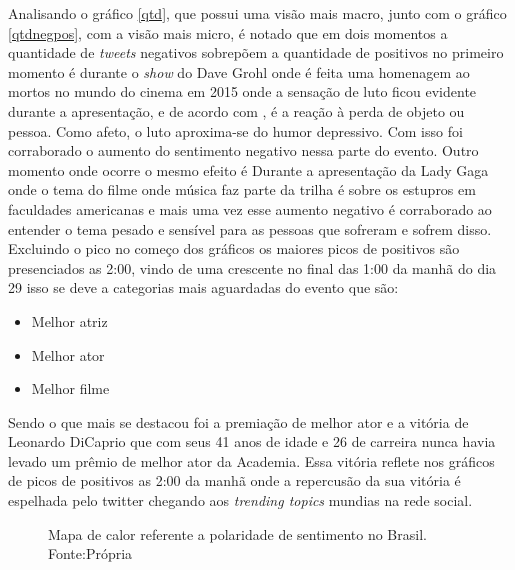 Analisando o gráfico \ref{qtd}, que possui uma visão mais macro, junto com o gráfico \ref{qtdnegpos}, com a visão mais micro, é notado que em dois momentos a quantidade de \textit{tweets} negativos sobrepõem a quantidade de positivos no primeiro momento é durante o \textit{show} do Dave Grohl onde é feita uma homenagem ao mortos no mundo do cinema em 2015 onde a sensação de luto ficou evidente durante a apresentação, e de acordo com \cite{freud1908conferencias}, é a reação à perda de objeto ou pessoa. Como afeto, o luto aproxima-se do humor depressivo. Com isso foi corraborado o aumento do sentimento negativo nessa parte do evento. Outro momento onde ocorre o mesmo efeito é Durante a apresentação da Lady Gaga onde o tema do filme onde música faz parte da trilha é sobre os estupros em faculdades americanas e mais uma vez esse aumento negativo é corraborado ao entender o tema pesado e sensível para as pessoas que sofreram e sofrem disso. Excluindo o pico no começo dos gráficos os maiores picos de positivos são presenciados as 2:00, vindo de uma crescente no final das 1:00 da manhã do dia 29 isso se deve a categorias mais aguardadas do evento que são:

 \begin{itemize}
 	\item Melhor atriz
 	\item Melhor ator
 	\item Melhor filme
 \end{itemize}

Sendo o que mais se destacou foi a premiação de melhor ator e a vitória de Leonardo DiCaprio que com seus 41 anos de idade e 26 de carreira nunca havia levado um prêmio de melhor ator da Academia. Essa vitória reflete nos gráficos de picos de positivos as 2:00 da manhã onde a repercusão da sua vitória é espelhada pelo twitter chegando aos \textit{trending topics} mundias na rede social.


\begin{figure}[!h]
	\centering{}
	\caption{Mapa de calor referente a polaridade de sentimento no Brasil. Fonte:Própria}
	\label{mapa}
\end{figure}